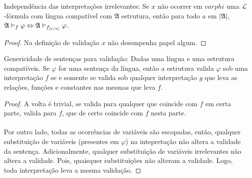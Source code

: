     \begin{lemma}{Independência das interpretações irrelevantes:}
        Se $x$ não ocorrer em $varphi$ uma $\mathcal{L}$-fórmula
        com língua compatível com $\mathfrak{A}$ estrutura, então
        para todo $a$ em $|\mathfrak{A}|$, $\mathfrak{A}\vDash_{f}
        \varphi\Leftrightarrow\mathfrak{A}\vDash_{f_{[x\slash{a}]}}\varphi$.
        \begin{proof}
            Na definição de validação $x$ não desempenha papel algum.\eop
        \end{proof}
    \end{lemma}

    \begin{theorem}{Genericidade de sentenças para validação:}
        Dadas uma língua e uma estrutura compatíveis. Se $\varphi$ for uma 
        sentença da língua, então a estrutura valida $\varphi$ sob uma 
        interpretação $f$ se e somente se valida sob qualquer interpretação 
        $g$ que leva as relações, funções e constantes nas mesmas que leva 
        $f$.
        \begin{proof}
            A volta é trivial, se valida para qualquer que coincide com $f$ em 
            certa parte, valida para $f$, que de certo coincide com $f$ nesta 
            parte.
            \paragraph{}
                Por outro lado, todas as ocorrências de variáveis são escopadas,
                então, qualquer substituição de variáveis (presentes em $\varphi$) 
                na intepretação não altera a validade da sentença. Adicionalmente,
                qualquer substituição de variáveis irrelevantes não altera a 
                validade. Pois, quaisquer substituições não alteram a validade.
                Logo, toda interpretação leva a mesma validação.\eop
        \end{proof}
    \end{theorem}

